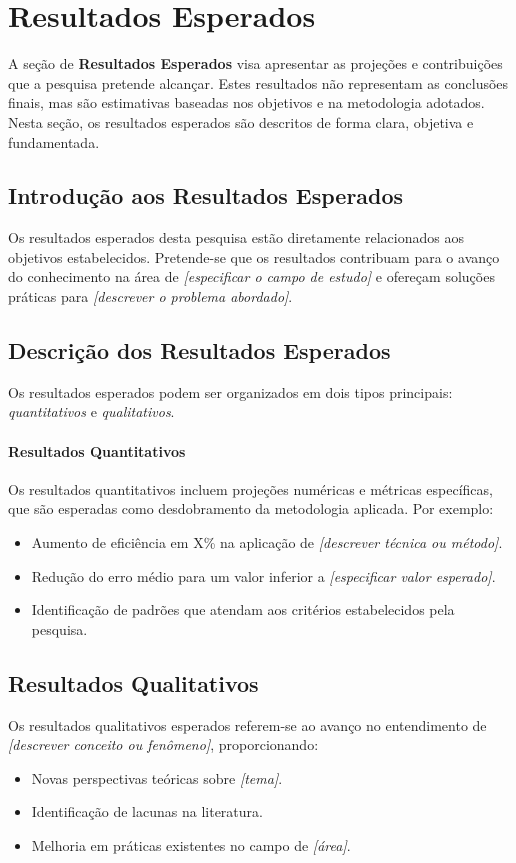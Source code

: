 \chapter{Resultados Esperados}

A seção de \textbf{Resultados Esperados} visa apresentar as projeções e contribuições que a pesquisa pretende alcançar. Estes resultados não representam as conclusões finais, mas são estimativas baseadas nos objetivos e na metodologia adotados. Nesta seção, os resultados esperados são descritos de forma clara, objetiva e fundamentada.

\section{Introdução aos Resultados Esperados}

Os resultados esperados desta pesquisa estão diretamente relacionados aos objetivos estabelecidos. Pretende-se que os resultados contribuam para o avanço do conhecimento na área de \textit{[especificar o campo de estudo]} e ofereçam soluções práticas para \textit{[descrever o problema abordado]}.

\section{Descrição dos Resultados Esperados}

Os resultados esperados podem ser organizados em dois tipos principais: \textit{quantitativos} e \textit{qualitativos}.

\subsubsection*{Resultados Quantitativos}
Os resultados quantitativos incluem projeções numéricas e métricas específicas, que são esperadas como desdobramento da metodologia aplicada. Por exemplo:
\begin{itemize}
    \item Aumento de eficiência em X\% na aplicação de \textit{[descrever técnica ou método]}.
    \item Redução do erro médio para um valor inferior a \textit{[especificar valor esperado]}.
    \item Identificação de padrões que atendam aos critérios estabelecidos pela pesquisa.
\end{itemize}

\section*{Resultados Qualitativos}
Os resultados qualitativos esperados referem-se ao avanço no entendimento de \textit{[descrever conceito ou fenômeno]}, proporcionando:
\begin{itemize}
    \item Novas perspectivas teóricas sobre \textit{[tema]}.
    \item Identificação de lacunas na literatura.
    \item Melhoria em práticas existentes no campo de \textit{[área]}.
\end{itemize}

